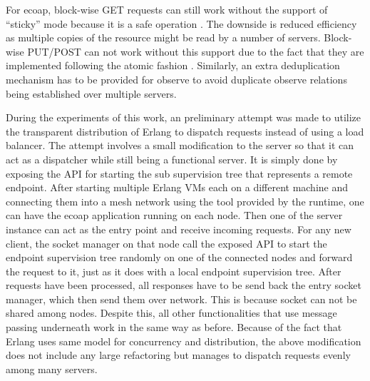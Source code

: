 For ecoap, block-wise GET requests can still work without the support of ``sticky'' mode because it is a safe operation \autocite{coap_protocol}. The downside is reduced efficiency as multiple copies of the resource might be read by a number of servers. Block-wise PUT/POST can not work without this support due to the fact that they are implemented following the atomic fashion \autocite{blockwise}. Similarly, an extra deduplication mechanism has to be provided for observe to avoid duplicate observe relations being established over multiple servers. 

During the experiments of this work, an preliminary attempt was made to utilize the transparent distribution of Erlang to dispatch requests instead of using a load balancer. The attempt involves a small modification to the server so that it can act as a dispatcher while still being a functional server. It is simply done by exposing the API for starting the sub supervision tree that represents a remote endpoint. After starting multiple Erlang VMs each on a different machine and connecting them into a mesh network using the tool provided by the runtime, one can have the ecoap application running on each node. Then one of the server instance can act as the entry point and receive incoming requests. For any new client, the socket manager on that node call the exposed API to start the endpoint supervision tree randomly on one of the connected nodes and forward the request to it, just as it does with a local endpoint supervision tree. After requests have been processed, all responses have to be send back the entry socket manager, which then send them over network. This is because socket can not be shared among nodes. Despite this, all other functionalities that use message passing underneath work in the same way as before. Because of the fact that Erlang uses same model for concurrency and distribution,
the above modification does not include any large refactoring but manages to dispatch requests evenly among many servers.


